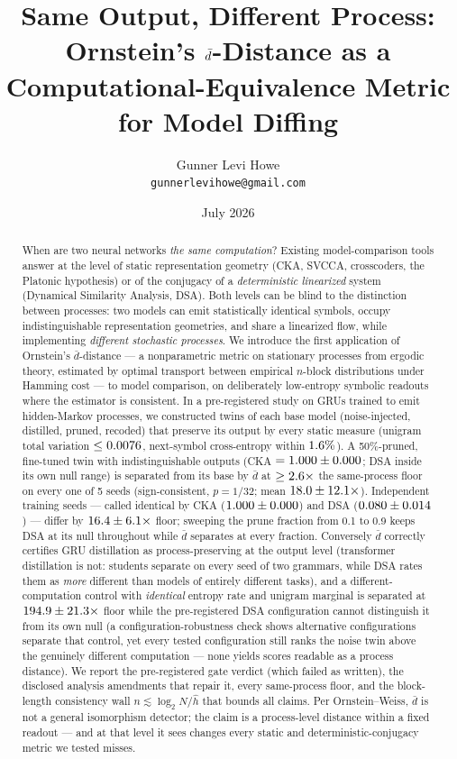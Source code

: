 \documentclass[11pt]{article}
\title{Same Output, Different Process: Ornstein's $\dbar$-Distance as a\\
Computational-Equivalence Metric for Model Diffing}
\author{Gunner Levi Howe\\
\small\texttt{gunnerlevihowe@gmail.com}}
\date{July 2026}
\newcommand{\dbar}{\bar d}
\begin{document}
\maketitle

\begin{abstract}
When are two neural networks \emph{the same computation}? Existing model-comparison
tools answer at the level of static representation geometry (CKA, SVCCA, crosscoders,
the Platonic hypothesis) or of the conjugacy of a \emph{deterministic linearized}
system (Dynamical Similarity Analysis, DSA). Both levels can be blind to the
distinction between processes: two models can emit statistically identical symbols,
occupy indistinguishable representation geometries, and share a linearized flow, while
implementing \emph{different stochastic processes}. We introduce the first application
of Ornstein's $\dbar$-distance --- a nonparametric metric on stationary processes from
ergodic theory, estimated by optimal transport between empirical $n$-block
distributions under Hamming cost --- to model comparison, on deliberately low-entropy
symbolic readouts where the estimator is consistent. In a pre-registered study on
GRUs trained to emit hidden-Markov processes, we constructed twins of each base model
(noise-injected, distilled, pruned, recoded) that preserve its output by every static
measure (unigram total variation $\le 0.0076$, next-symbol cross-entropy
within $1.6\%$). A 50\%-pruned, fine-tuned twin with indistinguishable outputs
(CKA $= 1.000 \pm 0.000$; DSA inside its own null range) is separated from its base by
$\dbar$ at $\ge 2.6\times$ the same-process floor on every one of 5 seeds
(sign-consistent, $p = 1/32$; mean $18.0 \pm 12.1\times$). Independent training seeds --- called identical by CKA
($1.000 \pm 0.000$) and DSA ($0.080 \pm 0.014$) --- differ by $16.4 \pm 6.1\times$ floor; sweeping the
prune fraction from 0.1 to 0.9 keeps DSA at its null throughout while $\dbar$
separates at every fraction. Conversely $\dbar$ correctly certifies GRU distillation
as process-preserving at the output level (transformer distillation is not: students
separate on every seed of two grammars, while DSA rates them as \emph{more} different
than models of entirely different tasks), and a different-computation control with
\emph{identical} entropy rate and unigram marginal is separated at
$194.9 \pm 21.3\times$ floor while the pre-registered DSA configuration cannot
distinguish it from its own null (a configuration-robustness check shows alternative
configurations separate that control, yet every tested configuration still ranks the
noise twin above the genuinely different computation --- none yields scores readable
as a process distance). We report the pre-registered gate verdict (which failed as
written), the disclosed analysis amendments that repair it, every same-process
floor, and the block-length consistency wall $n \lesssim \log_2 N/\hat h$ that bounds
all claims. Per Ornstein--Weiss, $\dbar$ is not a general isomorphism detector; the
claim is a process-level distance within a fixed readout --- and at that level it sees
changes every static and deterministic-conjugacy metric we tested misses.
\end{abstract}
\end{document}
